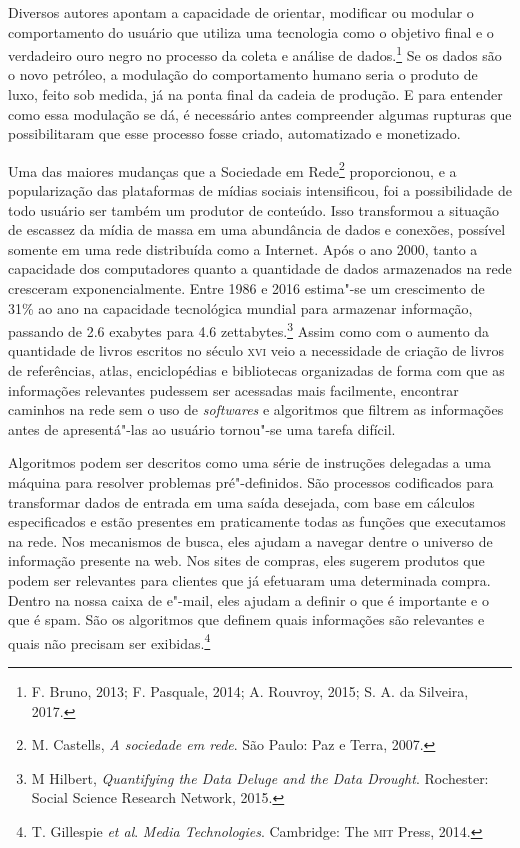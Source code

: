 Diversos autores apontam a capacidade de orientar, modificar ou modular
o comportamento do usuário que utiliza uma tecnologia como o objetivo
final e o verdadeiro ouro negro no processo da coleta e análise de dados.\footnote{F. Bruno, 2013; F. Pasquale, 2014; A. Rouvroy, 2015; S. A. da Silveira, 2017.} Se os dados são o novo petróleo, a modulação do comportamento humano seria o
produto de luxo, feito sob medida, já na ponta final da cadeia de
produção. E para entender como essa modulação se dá, é necessário antes
compreender algumas rupturas que possibilitaram que esse processo fosse
criado, automatizado e monetizado.

Uma das maiores mudanças que a Sociedade em Rede\footnote{M. Castells, \textit{A sociedade em rede}. São Paulo: Paz e Terra, 2007.}
proporcionou, e a popularização das plataformas de mídias sociais
intensificou, foi a possibilidade de todo usuário ser também um produtor
de conteúdo. Isso transformou a situação de escassez da mídia de massa
em uma abundância de dados e conexões, possível somente em uma rede
distribuída como a Internet. Após o ano 2000, tanto a capacidade dos
computadores quanto a quantidade de dados armazenados na rede
cresceram exponencialmente. Entre 1986 e 2016 estima"-se um crescimento de
31\% ao ano na capacidade tecnológica mundial para armazenar informação,
passando de 2.6 exabytes para 4.6 zettabytes.\footnote{M Hilbert, \textit{Quantifying the Data Deluge and the Data Drought}. Rochester: Social Science Research Network, 2015.} Assim como
com o aumento da quantidade de livros escritos no século \textsc{xvi} veio a
necessidade de criação de livros de referências, atlas, enciclopédias e
bibliotecas organizadas de forma com que as informações relevantes
pudessem ser acessadas mais facilmente, encontrar caminhos na rede sem o
uso de \textit{softwares} e algoritmos que filtrem as informações antes de
apresentá"-las ao usuário tornou"-se uma tarefa difícil.


Algoritmos podem ser descritos como uma série de instruções delegadas a
uma máquina para resolver problemas pré"-definidos. São processos
codificados para transformar dados de entrada em uma saída desejada, com
base em cálculos especificados e estão presentes em praticamente todas
as funções que executamos na rede. Nos mecanismos de busca, eles ajudam
a navegar dentre o universo de informação presente na web. Nos sites de
compras, eles sugerem produtos que podem ser relevantes para clientes
que já efetuaram uma determinada compra. Dentro na nossa caixa de
e"-mail, eles ajudam a definir o que é importante e o que é spam. São os
algoritmos que definem quais informações são relevantes e quais não
precisam ser exibidas.\footnote{T. Gillespie \textit{et al}. \textit{Media
Technologies}. Cambridge: The \textsc{mit} Press, 2014.}

